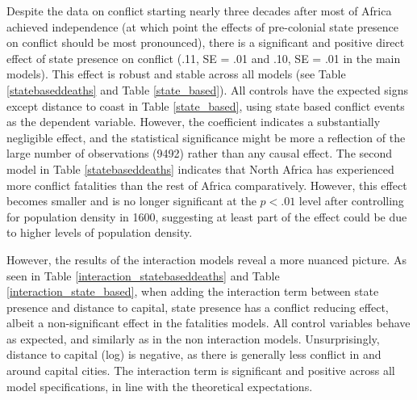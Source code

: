 \documentclass[12pt]{article}
\begin{document}
Despite the data on conflict starting nearly three decades after most of Africa
achieved independence (at which point the effects of pre-colonial state presence
on conflict should be most pronounced), there is a significant
and positive direct effect of state presence on conflict (.11, SE = .01 and .10,
SE = .01 in the main models). This effect is robust and stable across all models
(see Table \ref{statebaseddeaths} and Table \ref{state_based}). All controls
have the expected signs except distance to coast in Table \ref{state_based},
using state based conflict events as the dependent variable. However, the
coefficient indicates a substantially negligible effect, and the statistical
significance might be more a reflection of the large number of observations
(9492) rather than any causal effect. The second model in Table
\ref{statebaseddeaths} indicates that North Africa has experienced more conflict
fatalities than the rest of Africa comparatively. However, this effect becomes
smaller and is no longer significant at the $ p < .01 $ level after controlling
for population density in 1600, suggesting at least part of the effect could be
due to higher levels of population density.

However, the results of the interaction models reveal a more nuanced picture. As
seen in Table \ref{interaction_statebaseddeaths} and Table
\ref{interaction_state_based}, when adding the interaction term between state
presence and distance to capital, state presence has a conflict reducing effect,
albeit a non-significant effect in the fatalities models. All control variables
behave as expected, and similarly as in the non interaction models.
Unsurprisingly, distance to capital (log) is negative, as there is generally
less conflict in and around capital cities. The interaction term is significant
and positive across all model specifications, in line with the theoretical
expectations. 
\end{document}
